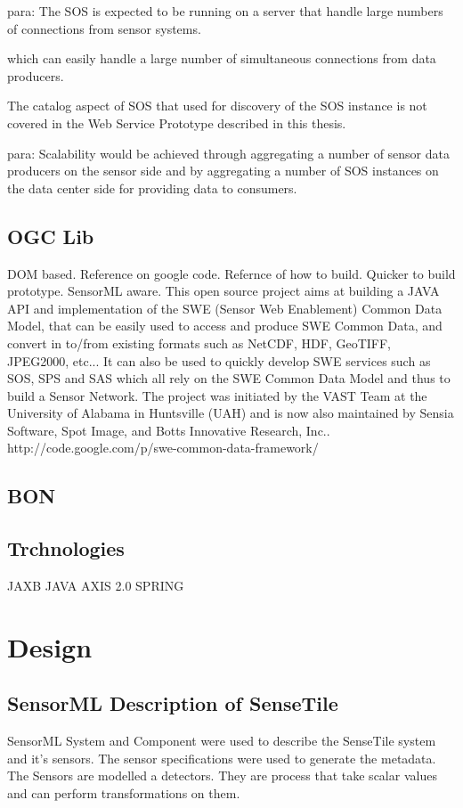 \documentclass[]{final_report}
\begin{document}
para: The SOS is expected to be running on a  server that  handle large numbers of connections
from sensor systems.

which can easily handle a large number of simultaneous connections from data
producers.

 The catalog aspect of SOS that used for discovery of the SOS instance is not covered in the Web Service Prototype described in this thesis.

para: Scalability would be achieved through aggregating a number of
sensor data producers on the sensor side and by aggregating a number of SOS instances
on the data center side for providing data to consumers. 


\section{OGC Lib}
DOM based. Reference on google code. Refernce of how to build. Quicker to build prototype. SensorML aware.
This open source project aims at building a JAVA API and implementation of the SWE (Sensor Web Enablement) Common Data Model, that can be easily used to access and produce SWE Common Data, and convert in to/from existing formats such as NetCDF, HDF, GeoTIFF, JPEG2000, etc... It can also be used to quickly develop SWE services such as SOS, SPS and SAS which all rely on the SWE Common Data Model and thus to build a Sensor Network.
The project was initiated by the VAST Team at the University of Alabama in Huntsville (UAH) and is now also maintained by Sensia Software, Spot Image, and Botts Innovative Research, Inc.. 
http://code.google.com/p/swe-common-data-framework/

\section{BON}
\section{Trchnologies}
JAXB
JAVA
AXIS 2.0
SPRING

\chapter{Design}
\section{SensorML Description of SenseTile}

SensorML System and Component were used to describe the SenseTile system and it's sensors. The sensor specifications were used to generate the metadata.
The Sensors are modelled a detectors. They are process that take scalar values
and can perform transformations on them.
\end{document}
